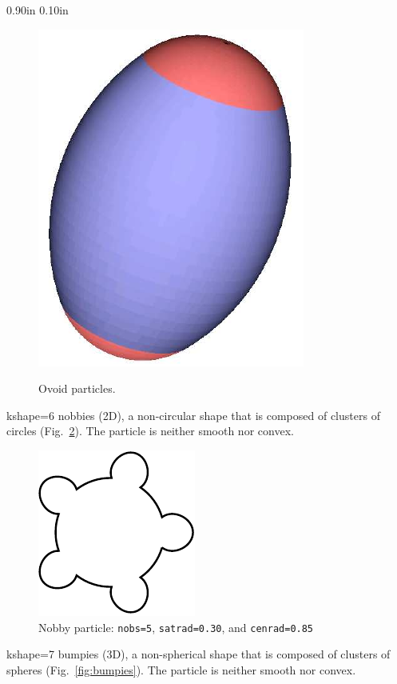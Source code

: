 \documentclass[letterpaper,11pt]{article}
\newlength{\Labelwidth}
\newcommand{\Entrylabel}[1]{\makebox[\Labelwidth][r]{\texttt{#1}}}
\newenvironment{Options}
{\begin{list}{}{%
\renewcommand{\makelabel}{\Entrylabel}%
\setlength{\leftmargin} {0.90in}%
\setlength{\rightmargin}{0.00in}%
\setlength{\labelsep}   {0.10in}%
\setlength{\labelwidth} {\Labelwidth}%
}}
{\end{list}}
\begin{document}
\begin{Options}
\begin{figure}
{\includegraphics[scale=0.7]{Figures/snapshot1b}}%
\caption{Ovoid particles.}
\label{fig:ovoids}
\end{figure}
%
\item[kshape=6]
nobbies (2D), a non-circular shape that is composed
of clusters of circles (Fig.~\ref{fig:nobbies}).
The particle is neither smooth nor convex.
\begin{figure}
\centering
\includegraphics[scale=1.00]{Figures/Nobby_5_03_085}
\caption{Nobby particle: \texttt{nobs=5}, 
                          \texttt{satrad=0.30}, and \texttt{cenrad=0.85}}
\label{fig:nobbies}
\end{figure}
%
\item[kshape=7]
bumpies (3D), a non-spherical shape that is composed
of clusters of spheres (Fig.~\ref{fig:bumpies}).
The particle is neither smooth nor convex.
\begin{figure}
\centering
\subfigure[\texttt{nbumps=2}, \texttt{satrad=0.7}, 
           \texttt{cenrad=0.9}, \texttt{cirrad=0.75}]

\end{figure}
\end{Options}
\end{document}
